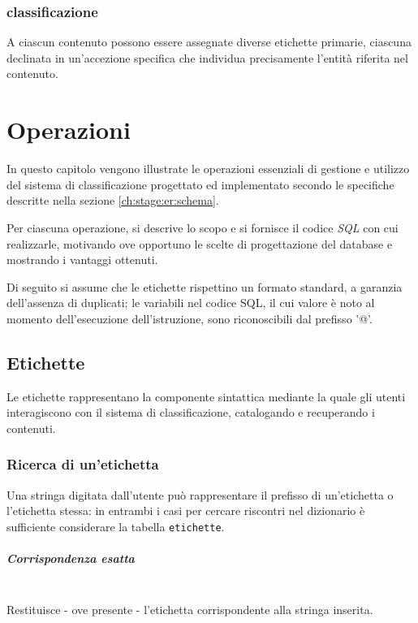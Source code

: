 \documentclass[10pt,a4paper,headinclude,footinclude,hidelinks]{scrreprt} %
\begin{document}
	\subsection{classificazione}
	A ciascun contenuto possono essere assegnate diverse etichette primarie, ciascuna declinata in un'accezione specifica che individua precisamente l'entità riferita nel contenuto.

	\chapter{Operazioni}
	\label{ch:stage:er:operazioni}
	In questo capitolo vengono illustrate le operazioni essenziali di gestione e utilizzo del sistema di classificazione progettato ed implementato secondo le specifiche descritte nella sezione \ref{ch:stage:er:schema}.

	Per ciascuna operazione, si descrive lo scopo e si fornisce il codice \textit{SQL} con cui realizzarle, motivando ove opportuno le scelte di progettazione del database e mostrando i vantaggi ottenuti.

	Di seguito si assume che le etichette rispettino un formato standard, a garanzia dell'assenza di duplicati; le variabili nel codice SQL, il cui valore è noto al momento dell'esecuzione dell'istruzione, sono riconoscibili dal prefisso '@'.


	\section{Etichette}
	\label{ch:stage:er:operazioni:etichette}
	Le etichette rappresentano la componente sintattica mediante la quale gli utenti interagiscono con il sistema di classificazione, catalogando e recuperando i contenuti.

	\subsection{Ricerca di un'etichetta}
	\label{ch:stage:er:operazioni:etichette:ricerca}
	Una stringa digitata dall'utente può rappresentare il prefisso di un'etichetta o l'etichetta stessa: in entrambi i casi per cercare riscontri nel dizionario è sufficiente considerare la tabella \texttt{etichette}.

	\paragraph{Corrispondenza esatta} \hfill \\
	Restituisce - ove presente - l'etichetta corrispondente alla stringa inserita.
\end{document}
